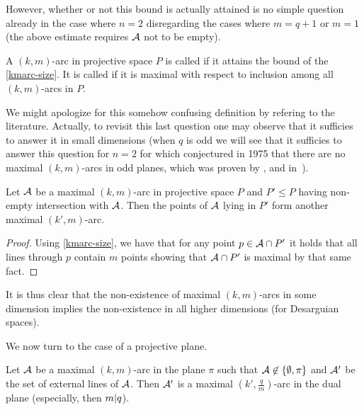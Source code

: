 However, whether or not this bound is actually attained is no simple question already in the case where $n=2$ disregarding the cases where $m=q+1$ or $m=1$ (the above estimate requires $\mathcal{A}$ not to be empty).

\begin{definition}\label{kmarc-def}
    A $(k,m)$-arc in projective space $P$ is called  if it attains the bound of the \autoref{kmarc-size}.
    It is called  if it is maximal with respect to inclusion among all $(k,m)$-arcs in $P$.
\end{definition}

We might apologize for this somehow confusing definition by refering to the literature. Actually, to revisit this last question one
may observe that it sufficies to answer it in small dimensions (when $q$ is odd we will see that it sufficies to answer this question for $n=2$ for which  conjectured in 1975 that there are no maximal $(k,m)$-arcs in odd planes, which was proven by ,  and  in~\cite{ball1997maxkmarcs}).

\begin{lemma}
    Let $\mathcal{A}$ be a maximal $(k,m)$-arc in projective space $P$ and $P'\leq P$ having non-empty intersection with $\mathcal{A}$. Then the points of $\mathcal{A}$ lying in $P'$ form another maximal $(k',m)$-arc.
\end{lemma}

\begin{proof}
    Using \autoref{kmarc-size}, we have that for any point $p\in \mathcal{A}\cap P'$ it holds that all lines through $p$ contain $m$ points showing that $\mathcal{A}\cap P'$ is maximal by that same fact.
\end{proof}

It is thus clear that the non-existence of maximal $(k,m)$-arcs in some dimension implies the non-existence in all higher dimensions (for Desarguian spaces).

We now turn to the case of a projective plane.

\begin{lemma}\label{kmarc-dual}
    Let $\mathcal{A}$ be a maximal $(k,m)$-arc in the plane $\pi$ such that $\cA\not\in\set{\emptyset,\pi}$ and $\mathcal{A}'$ be the set of external lines of $\mathcal{A}$. Then $\mathcal{A}'$ is a maximal $(k',\frac{q}{m})$-arc in the dual plane (especially, then $m| q$).
\end{lemma}

